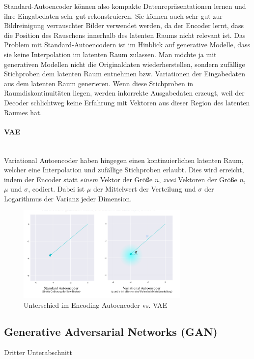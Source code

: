 Standard-Autoencoder können also kompakte Datenrepräsentationen lernen und ihre Eingabedaten sehr gut rekonstruieren. Sie können auch sehr gut zur Bildreinigung verrauschter Bilder verwendet werden, da der Encoder lernt, dass die Position des Rauschens innerhalb des latenten Raums nicht relevant ist. Das Problem mit Standard-Autoencodern ist im Hinblick auf generative Modelle, dass sie keine Interpolation im latenten Raum zulassen. Man möchte ja mit generativen Modellen nicht die Originaldaten wiederherstellen, sondern zufällige Stichproben dem latenten Raum entnehmen bzw. Variationen der Eingabedaten aus dem latenten Raum generieren. Wenn diese Stichproben in Raumdiskontinuitäten liegen, werden inkorrekte Ausgabedaten erzeugt, weil der Decoder schlichtweg keine Erfahrung mit Vektoren aus dieser Region des latenten Raumes hat.

\paragraph{VAE}~\\
Variational Autoencoder haben hingegen einen kontinuierlichen latenten Raum, welcher eine Interpolation und zufällige Stichproben erlaubt. Dies wird erreicht, indem der Encoder statt \emph{einem} Vektor der Größe $n$, \emph{zwei} Vektoren der Größe $n$, $\mu$ und $\sigma$, codiert. Dabei ist $\mu$ der Mittelwert der Verteilung und $\sigma$ der Logarithmus der Varianz jeder Dimension.
\begin{figure}[htb]
    \centering
    \includegraphics[width=0.75\textwidth,angle=0]{abb/VAE_muandsigma.png}
    \caption[VAE]{Unterschied im Encoding Autoencoder vs. VAE}
\end{figure}


\subsection{Generative Adversarial Networks (GAN)}\label{Generative Adversarial Networks (GAN)}

Dritter Unterabschnitt
